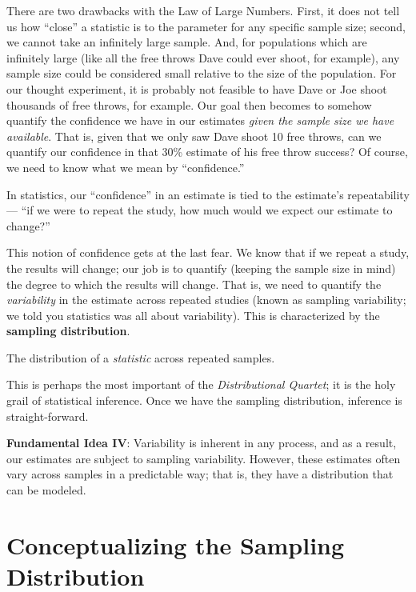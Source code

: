 \documentclass[]{book}
\theoremstyle{plain}
\theoremstyle{mydefn}
\theoremstyle{myexmpl}
\theoremstyle{remark}
\let\BeginKnitrBlock\begin \let\EndKnitrBlock\end
\let\BeginKnitrBlock\begin \let\EndKnitrBlock\end
\begin{document}
There are two drawbacks with the Law of Large Numbers. First, it does
not tell us how ``close'' a statistic is to the parameter for any
specific sample size; second, we cannot take an infinitely large sample.
And, for populations which are infinitely large (like all the free
throws Dave could ever shoot, for example), any sample size could be
considered small relative to the size of the population. For our thought
experiment, it is probably not feasible to have Dave or Joe shoot
thousands of free throws, for example. Our goal then becomes to somehow
quantify the confidence we have in our estimates \emph{given the sample
size we have available}. That is, given that we only saw Dave shoot 10
free throws, can we quantify our confidence in that 30\% estimate of his
free throw success? Of course, we need to know what we mean by
``confidence.''

\BeginKnitrBlock{rmdkeyidea}
In statistics, our ``confidence'' in an estimate is tied to the
estimate's repeatability --- ``if we were to repeat the study, how much
would we expect our estimate to change?''
\EndKnitrBlock{rmdkeyidea}

This notion of confidence gets at the last fear. We know that if we
repeat a study, the results will change; our job is to quantify (keeping
the sample size in mind) the degree to which the results will change.
That is, we need to quantify the \emph{variability} in the estimate
across repeated studies (known as sampling variability; we told you
statistics was all about variability). This is characterized by the
\textbf{sampling distribution}.

\BeginKnitrBlock{definition}[Sampling Distribution]
\protect\hypertarget{def:defn-sampling-distribution}{}{\label{def:defn-sampling-distribution}
{} }The distribution of a
\emph{statistic} across repeated samples.
\EndKnitrBlock{definition}

This is perhaps the most important of the \emph{Distributional Quartet};
it is the holy grail of statistical inference. Once we have the sampling
distribution, inference is straight-forward.

\BeginKnitrBlock{rmdfivefund}
\textbf{Fundamental Idea IV}: Variability is inherent in any process,
and as a result, our estimates are subject to sampling variability.
However, these estimates often vary across samples in a predictable way;
that is, they have a distribution that can be modeled.
\EndKnitrBlock{rmdfivefund}

\section{Conceptualizing the Sampling
Distribution}\label{conceptualizing-the-sampling-distribution}
\end{document}
